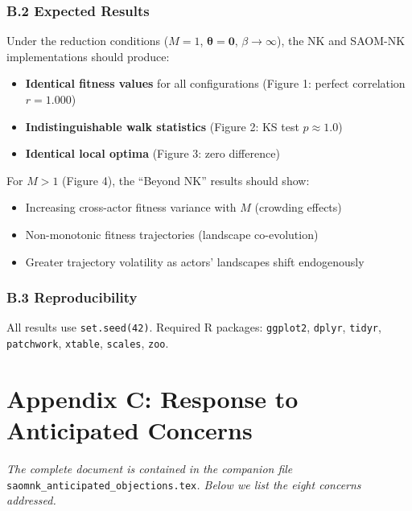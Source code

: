 \documentclass[12pt]{article}
\begin{document}
\section*{B.2 Expected Results}

Under the reduction conditions ($M=1$, $\boldsymbol{\theta}=\mathbf{0}$,
$\beta\to\infty$), the NK and SAOM-NK implementations should produce:
\begin{itemize}
  \item \textbf{Identical fitness values} for all configurations (Figure 1:
    perfect correlation $r = 1.000$)
  \item \textbf{Indistinguishable walk statistics} (Figure 2: KS test
    $p \approx 1.0$)
  \item \textbf{Identical local optima} (Figure 3: zero difference)
\end{itemize}

For $M > 1$ (Figure 4), the ``Beyond NK'' results should show:
\begin{itemize}
  \item Increasing cross-actor fitness variance with $M$ (crowding effects)
  \item Non-monotonic fitness trajectories (landscape co-evolution)
  \item Greater trajectory volatility as actors' landscapes shift
    endogenously
\end{itemize}

\section*{B.3 Reproducibility}

All results use \texttt{set.seed(42)}. Required R packages:
\texttt{ggplot2}, \texttt{dplyr}, \texttt{tidyr}, \texttt{patchwork},
\texttt{xtable}, \texttt{scales}, \texttt{zoo}.



\newpage
\part*{Appendix C: Response to Anticipated Concerns}

\noindent\textit{The complete document is contained in the companion file}
\texttt{saomnk\_anticipated\_objections.tex}\textit{.
Below we list the eight concerns addressed.}
\end{document}
